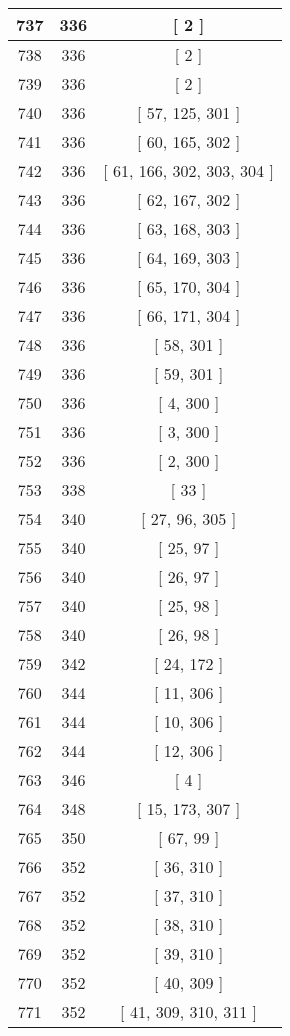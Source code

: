 \begin{center}
\begin{longtable}[H]{|| c c c ||}
\hline
737 & 336 & [ 2 ] \\ 
\hline
738 & 336 & [ 2 ] \\ 
\hline
739 & 336 & [ 2 ] \\ 
\hline
740 & 336 & [ 57, 125, 301 ] \\ 
\hline
741 & 336 & [ 60, 165, 302 ] \\ 
\hline
742 & 336 & [ 61, 166, 302, 303, 304 ] \\ 
\hline
743 & 336 & [ 62, 167, 302 ] \\ 
\hline
744 & 336 & [ 63, 168, 303 ] \\ 
\hline
745 & 336 & [ 64, 169, 303 ] \\ 
\hline
746 & 336 & [ 65, 170, 304 ] \\ 
\hline
747 & 336 & [ 66, 171, 304 ] \\ 
\hline
748 & 336 & [ 58, 301 ] \\ 
\hline
749 & 336 & [ 59, 301 ] \\ 
\hline
750 & 336 & [ 4, 300 ] \\ 
\hline
751 & 336 & [ 3, 300 ] \\ 
\hline
752 & 336 & [ 2, 300 ] \\ 
\hline
753 & 338 & [ 33 ] \\ 
\hline
754 & 340 & [ 27, 96, 305 ] \\ 
\hline
755 & 340 & [ 25, 97 ] \\ 
\hline
756 & 340 & [ 26, 97 ] \\ 
\hline
757 & 340 & [ 25, 98 ] \\ 
\hline
758 & 340 & [ 26, 98 ] \\ 
\hline
759 & 342 & [ 24, 172 ] \\ 
\hline
760 & 344 & [ 11, 306 ] \\ 
\hline
761 & 344 & [ 10, 306 ] \\ 
\hline
762 & 344 & [ 12, 306 ] \\ 
\hline
763 & 346 & [ 4 ] \\ 
\hline
764 & 348 & [ 15, 173, 307 ] \\ 
\hline
765 & 350 & [ 67, 99 ] \\ 
\hline
766 & 352 & [ 36, 310 ] \\ 
\hline
767 & 352 & [ 37, 310 ] \\ 
\hline
768 & 352 & [ 38, 310 ] \\ 
\hline
769 & 352 & [ 39, 310 ] \\ 
\hline
770 & 352 & [ 40, 309 ] \\ 
\hline
771 & 352 & [ 41, 309, 310, 311 ] \\ 

\end{longtable}
\end{center}
